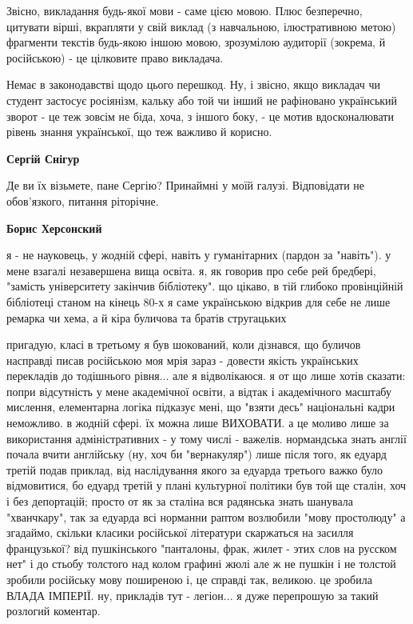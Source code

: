 \begin{itemize}
\begin{itemize}
Звісно, викладання будь-якої мови - саме цією мовою. Плюс безперечно, цитувати
вірші, вкрапляти у свій виклад (з навчальною, ілюстративною метою) фрагменти
текстів будь-якою іншою мовою, зрозумілою аудиторії (зокрема, й російською) -
це цілковите право викладача. 

Немає в законодавстві щодо цього перешкод. Ну, і
звісно, якщо викладач чи студент застосує росіянізм, кальку або той чи інший не
рафіновано український зворот - це теж зовсім не біда, хоча, з іншого боку, -
це мотив вдосконалювати рівень знання української, що теж важливо й корисно.


 
\textbf{Сергій Снігур} 

Де ви їх візьмете, пане Сергію? Принаймні у моїй галузі. Відповідати не
обов'язкого, питання ріторічне.

 

\textbf{Борис Херсонский} 

я - не науковець, у жодній сфері, навіть у гуманітарних (пардон за "навіть"). у
мене взагалі незавершена вища освіта. я, як говорив про себе рей бредбері,
"замість університету закінчив бібліотеку". що цікаво, в тій глибоко
провінційній бібліотеці станом на кінець 80-х я саме українською відкрив для
себе не лише ремарка чи хема, а й кіра буличова та братів стругацьких \Smiley[1.0][yellow]

пригадую, класі в третьому я був шокований, коли дізнався, що буличов насправді
писав російською \Smiley[1.0][yellow] моя мрія зараз - довести якість українських перекладів до
тодішнього рівня... але я відволікаюся. я от що лише хотів сказати: попри
відсутність у мене академічної освіти, а відтак і академічного масштабу
мислення, елементарна логіка підказує мені, що "взяти десь" національні кадри
неможливо. в жодній сфері. їх можна лише ВИХОВАТИ. а це моливо лише за
використання адміністративних - у тому числі - важелів. нормандська знать
англії почала вчити англійську (ну, хоч би "вернакуляр") лише після того, як
едуард третій подав приклад, від наслідування якого за едуарда третього важко
було відмовитися, бо едуард третій у плані культурної політики був той ще
сталін, хоч і без депортацій; просто от як за сталіна вся радянська знать
шанувала "хванчкару", так за едуарда всі норманни раптом возлюбили "мову
простолюду" \Smiley[1.0][yellow] а згадаймо, скільки класики російської літератури скаржаться на
засилля французької? від пушкінського "панталоны, фрак, жилет - этих слов на
русском нет" і до стьобу толстого над колом графині жюлі \Smiley[1.0][yellow] але ж не пушкін і
не толстой зробили російську мову поширеною і, це справді так, великою. це
зробила ВЛАДА ІМПЕРІЇ. ну, прикладів тут - легіон... я дуже перепрошую за такий
розлогий коментар.


\end{itemize}
\end{itemize}
